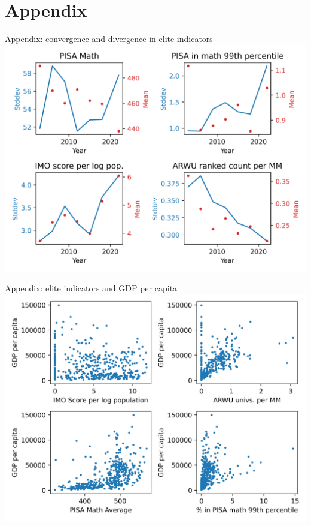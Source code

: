 \documentclass[10pt]{beamer}
\begin{document}
\section{Appendix}
\begin{frame}{Appendix: convergence and divergence in elite indicators}
    \centering
    \includegraphics[width=\textwidth]{../charts/std-dev.png}
\end{frame}

\begin{frame}{Appendix: elite indicators and GDP per capita}
    \centering
    \includegraphics[width=\textwidth]{../charts/relationships-gdp-pc.png}
\end{frame}
\end{document}
